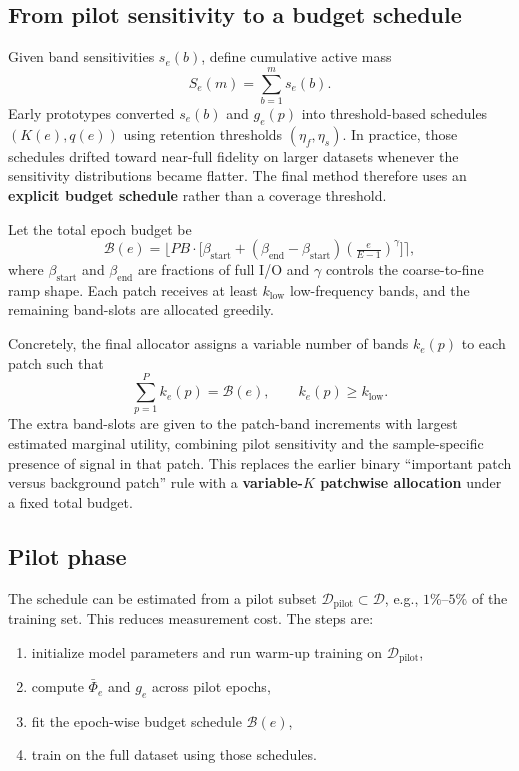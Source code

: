\documentclass[10pt,twocolumn]{article}
\newcommand{\D}{\mathcal{D}}
\begin{document}
\subsection{From pilot sensitivity to a budget schedule}
Given band sensitivities $s_e(b)$, define cumulative active mass
\begin{equation}
    S_e(m) = \sum_{b=1}^{m} s_e(b).
\end{equation}
Early prototypes converted $s_e(b)$ and $g_e(p)$ into threshold-based schedules $(K(e),q(e))$ using retention thresholds $(\eta_f,\eta_s)$. In practice, those schedules drifted toward near-full fidelity on larger datasets whenever the sensitivity distributions became flatter. The final method therefore uses an \textbf{explicit budget schedule} rather than a coverage threshold.

Let the total epoch budget be
\begin{equation}
    \mathcal{B}(e) = \Big\lfloor PB \cdot \big[\beta_{\mathrm{start}} + (\beta_{\mathrm{end}}-\beta_{\mathrm{start}})(\tfrac{e}{E-1})^\gamma \big] \Big\rceil,
\end{equation}
where $\beta_{\mathrm{start}}$ and $\beta_{\mathrm{end}}$ are fractions of full I/O and $\gamma$ controls the coarse-to-fine ramp shape. Each patch receives at least $k_{\mathrm{low}}$ low-frequency bands, and the remaining band-slots are allocated greedily.

Concretely, the final allocator assigns a variable number of bands $k_e(p)$ to each patch such that
\begin{equation}
    \sum_{p=1}^{P} k_e(p) = \mathcal{B}(e), \qquad k_e(p) \ge k_{\mathrm{low}}.
\end{equation}
The extra band-slots are given to the patch-band increments with largest estimated marginal utility, combining pilot sensitivity and the sample-specific presence of signal in that patch. This replaces the earlier binary ``important patch versus background patch'' rule with a \textbf{variable-$K$ patchwise allocation} under a fixed total budget.

\subsection{Pilot phase}
The schedule can be estimated from a pilot subset $\D_{\text{pilot}} \subset \D$, e.g., $1\%$--$5\%$ of the training set. This reduces measurement cost. The steps are:
\begin{enumerate}
    \item initialize model parameters and run warm-up training on $\D_{\text{pilot}}$,
    \item compute $\bar\Phi_e$ and $g_e$ across pilot epochs,
    \item fit the epoch-wise budget schedule $\mathcal{B}(e)$,
    \item train on the full dataset using those schedules.
\end{enumerate}
\end{document}
